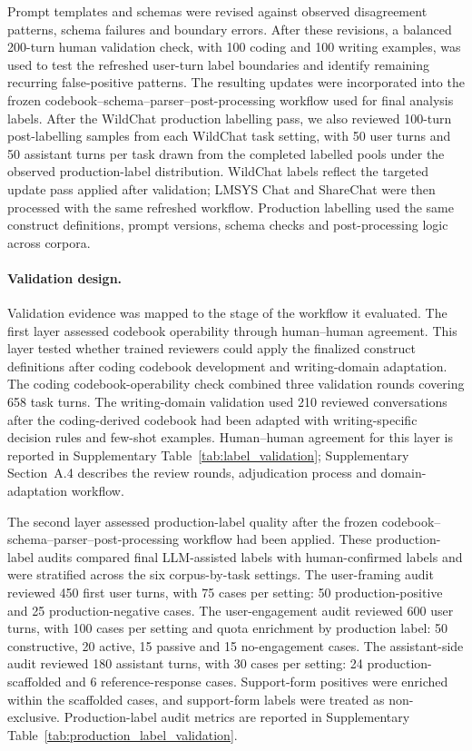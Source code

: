 Prompt templates and schemas were revised against observed disagreement patterns, schema failures and boundary errors. After these revisions, a balanced 200-turn human validation check, with 100 coding and 100 writing examples, was used to test the refreshed user-turn label boundaries and identify remaining recurring false-positive patterns. The resulting updates were incorporated into the frozen codebook--schema--parser--post-processing workflow used for final analysis labels.
After the WildChat production labelling pass, we also reviewed 100-turn post-labelling samples from each WildChat task setting, with 50 user turns and 50 assistant turns per task drawn from the completed labelled pools under the observed production-label distribution. WildChat labels reflect the targeted update pass applied after validation; LMSYS Chat and ShareChat were then processed with the same refreshed workflow. Production labelling used the same construct definitions, prompt versions, schema checks and
post-processing logic across corpora.

\paragraph{Validation design.}
Validation evidence was mapped to the stage of the workflow it evaluated. The first layer assessed codebook operability through human--human agreement. This layer tested whether trained reviewers could apply the finalized construct definitions after coding codebook development and writing-domain adaptation. The coding codebook-operability check combined three validation rounds covering 658 task turns. The writing-domain validation used 210 reviewed conversations after the coding-derived codebook had been adapted with writing-specific decision rules and few-shot examples. Human--human agreement for this layer is reported in
Supplementary Table~\ref{tab:label_validation}; Supplementary Section~A.4 describes the review rounds, adjudication process and domain-adaptation workflow.

The second layer assessed production-label quality after the frozen codebook--schema--parser--post-processing workflow had been applied. These production-label audits compared final LLM-assisted labels with human-confirmed labels and were stratified across the six corpus-by-task settings. The user-framing
audit reviewed 450 first user turns, with 75 cases per setting: 50 production-positive and 25 production-negative cases. The user-engagement audit reviewed 600 user turns, with 100 cases per setting and quota enrichment by production label: 50 constructive, 20 active, 15 passive and 15 no-engagement cases. The assistant-side audit reviewed 180 assistant turns, with 30 cases per setting: 24 production-scaffolded and 6 reference-response cases. Support-form positives were enriched within the
scaffolded cases, and support-form labels were treated as non-exclusive. Production-label audit metrics are reported in Supplementary Table~\ref{tab:production_label_validation}.


